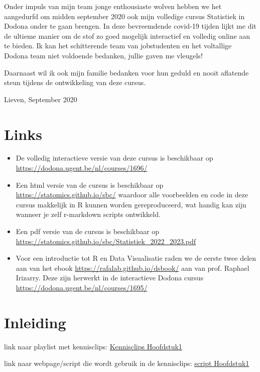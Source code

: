 \documentclass[
  12pt,dutch,coursenotes]{book}
\begin{document}
Onder impuls van mijn team jonge enthousiaste wolven hebben we het aangedurfd om midden september 2020 ook mijn volledige cursus Statistiek in Dodona onder te gaan brengen. In deze bevreemdende covid-19 tijden lijkt me dit de ultieme manier om de stof zo goed mogelijk interactief en volledig online aan te bieden.
Ik kan het schitterende team van jobstudenten en het voltallige Dodona team niet voldoende bedanken, jullie gaven me vleugels!

Daarnaast wil ik ook mijn familie bedanken voor hun geduld en nooit aflatende steun tijdens de ontwikkeling van deze cursus.

Lieven, September 2020

\hypertarget{links}{%
\chapter*{Links}\label{links}}

\begin{itemize}
\item
  De volledig interactieve versie van deze cursus is beschikbaar op \url{https://dodona.ugent.be/nl/courses/1696/}
\item
  Een html versie van de cursus is beschikbaar op \url{https://statomics.github.io/sbc/} waardoor alle voorbeelden en code in deze cursus makkelijk in R kunnen worden gereproduceerd, wat handig kan zijn wanneer je zelf r-markdown scripts ontwikkeld.
\item
  Een pdf versie van de cursus is beschikbaar op \url{https://statomics.github.io/sbc/Statistiek_2022_2023.pdf}
\item
  Voor een introductie tot R en Data Visualisatie raden we de eerste twee delen aan van het ebook \url{https://rafalab.github.io/dsbook/} aan van prof. Raphael Irizarry. Deze zijn herwerkt in de interactieve Dodona cursus \url{https://dodona.ugent.be/nl/courses/1695/}
\end{itemize}

\hypertarget{inleiding}{%
\chapter{Inleiding}\label{inleiding}}

link naar playlist met kennisclips:
\href{https://www.youtube.com/playlist?list=PLZH1hP8_LbJIk4G2AZYYKvgZLjRR-1-Iw}{Kennisclips Hoofdstuk1}

link naar webpage/script die wordt gebruik in de kennisclips: \href{https://statomics.github.io/sbc21/rmd/01-intro.html}{script Hoofdstuk1}
\end{document}
